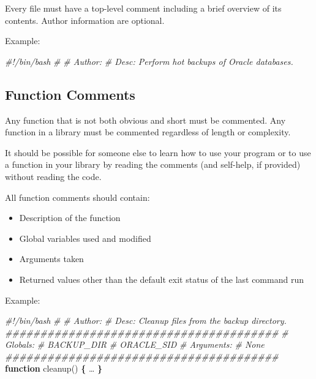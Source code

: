 \documentclass[
]{book}
\newenvironment{Shaded}{\begin{snugshade}}{\end{snugshade}}
\newcommand{\CommentTok}[1]{\textcolor[rgb]{0.56,0.35,0.01}{\textit{#1}}}
\newcommand{\FunctionTok}[1]{\textcolor[rgb]{0.00,0.00,0.00}{#1}}
\newcommand{\KeywordTok}[1]{\textcolor[rgb]{0.13,0.29,0.53}{\textbf{#1}}}
\newcommand{\NormalTok}[1]{#1}
\providecommand{\tightlist}{%
  \setlength{\itemsep}{0pt}\setlength{\parskip}{0pt}}
\begin{document}
Every file must have a top-level comment including a brief overview of its
contents. Author information are optional.

Example:

\begin{Shaded}
\begin{Highlighting}[]
\CommentTok{#!/bin/bash}
\CommentTok{# }
\CommentTok{# Author: }
\CommentTok{# Desc: Perform hot backups of Oracle databases.}
\end{Highlighting}
\end{Shaded}

\hypertarget{function-comments}{%
\subsection{Function Comments}\label{function-comments}}

Any function that is not both obvious and short must be commented. Any function
in a library must be commented regardless of length or complexity.

It should be possible for someone else to learn how to use your program or to
use a function in your library by reading the comments (and self-help, if
provided) without reading the code.

All function comments should contain:

\begin{itemize}
\tightlist
\item
  Description of the function
\item
  Global variables used and modified
\item
  Arguments taken
\item
  Returned values other than the default exit status of the last command run
\end{itemize}

Example:

\begin{Shaded}
\begin{Highlighting}[]
\CommentTok{#!/bin/bash}
\CommentTok{# }
\CommentTok{# Author:}
\CommentTok{# Desc: Cleanup files from the backup directory.}
\CommentTok{#######################################}
\CommentTok{# Globals:}
\CommentTok{#   BACKUP_DIR}
\CommentTok{#   ORACLE_SID}
\CommentTok{# Arguments:}
\CommentTok{#   None}
\CommentTok{#######################################}
\KeywordTok{function}\FunctionTok{ cleanup()} \KeywordTok{\{}
\NormalTok{  …}
\KeywordTok{\}}
\end{Highlighting}
\end{Shaded}
\end{document}
